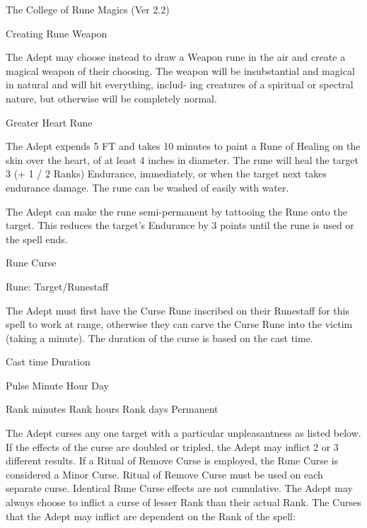 \begin{Chapter}{The College of Rune Magics (Ver 2.2)}
\begin{spell}[S-4]{Creating Rune Weapon }
\begin{effects}
The  Adept  may  choose  instead  to  draw  a  Weapon 
rune in the air and create a magical weapon of their 
choosing.  The  weapon  will  be  insubstantial  and 
magical  in  natural  and  will  hit  everything,  includ-
ing  creatures  of  a  spiritual  or  spectral  nature,  but 
otherwise will be completely normal. 

\end{effects}
\end{spell}

\begin{spell}[S-5]{Greater Heart Rune}

\begin{effects}
The Adept expends 5 FT and takes 10 minutes to paint a Rune of Healing
on the skin over the heart, of at least 4 inches in diameter.  The
rune will heal the target 3 (+ 1 / 2 Ranks) Endurance, immediately, or
when the target next takes endurance damage.  The rune can be washed
of easily with water.

The Adept can make the rune semi-permanent by tattooing the Rune onto
the target. This reduces the target’s Endurance by 3 points until the
rune is used or the spell ends.
\end{effects}
\end{spell}

\begin{spell}[S-6]{Rune Curse }

Rune: Target/Runestaff 
\begin{effects}
The Adept must first have the Curse Rune inscribed on their Runestaff
for this spell to work at range, otherwise they can carve the Curse
Rune into the victim (taking a minute).  The duration of the curse is
based on the cast time.

Cast time  Duration  

Pulse 
Minute 
Hour 
Day 

Rank minutes  
Rank hours  
Rank days  
Permanent 

The Adept curses any one target with a particular unpleasantness as
listed below. If the effects of the curse are doubled or tripled, the
Adept may inflict 2 or 3 different results.  If a Ritual of Remove
Curse is employed, the Rune Curse is considered a Minor Curse.  Ritual
of Remove Curse must be used on each separate curse.  Identical Rune
Curse effects are not cumulative. The Adept may always choose to
inflict a curse of lesser Rank than their actual Rank. The Curses that
the Adept may inflict are dependent on the Rank of the spell:


\end{effects}
\end{spell}
\end{Chapter}
